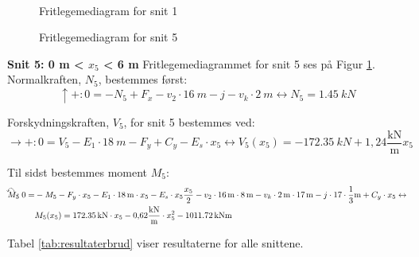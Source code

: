 \begin{figure}[H]
\begin{minipage}[b]{0.48\textwidth}
	\end{minipage}\\ %
	\begin{minipage}[t]{0.48\textwidth}
		\caption{Fritlegemediagram for snit 1} %
		\label{fig:snitet}
	\end{minipage}\hfill
	\begin{minipage}[t]{0.48\textwidth}
		\caption{Fritlegemediagram for snit 5} %
		\label{fig:snitfem}
	\end{minipage}
\end{figure}

\textbf{Snit 5: 0 m < $x_5$ < 6 m}
\newline
Fritlegemediagrammet for snit 5 ses på Figur \ref{fig:snitfem}.
\newline
\newline
Normalkraften, $N_5$, bestemmes først:
\begin{equation}
	\uparrow+: 0 = - N_5 + F_x - v_2 \cdot \SI{16}{m} - j - v_k \cdot \SI{2}{m} \leftrightarrow N_5 = \SI{1,45}{kN}
\end{equation}

Forskydningskraften, $V_5$, for snit 5 bestemmes ved:
\begin{equation}
	\rightarrow+: 0 = V_5 - E_1 \cdot \SI{18}{m} - F_y + C_y - E_s \cdot x_5 \leftrightarrow V_5(x_5) = \SI{-172,35}{kN} + 1,\!24 \frac{\text{kN}}{\text{m}}x_5
\end{equation}

Til sidst bestemmes moment $M_5$:
\begin{equation}
\begin{split}
	\ALN{\text{$M_5$}}: 0 = & - M_5 - F_y \cdot x_5 - E_1 \cdot \SI{18}{m} \cdot x_5 - E_s \cdot x_5 \frac{x_5}{2} - v_2 \cdot \SI{16}{m} \cdot \SI{8}{m} - v_k \cdot \SI{2}{m} \cdot \SI{17}{m} - j \cdot 17 \cdot \frac{1}{3} \text{m} + C_y \cdot x_5 \leftrightarrow \\ & M_5(x_5) =  \SI{172,35}{kN} \cdot x_5 - 0,\!62 \frac{\text{kN}}{\text{m}} \cdot x_5^2 - \SI{1011,72}{kNm}
\end{split}
\end{equation}

Tabel \ref{tab:resultaterbrud} viser resultaterne for alle snittene. 

